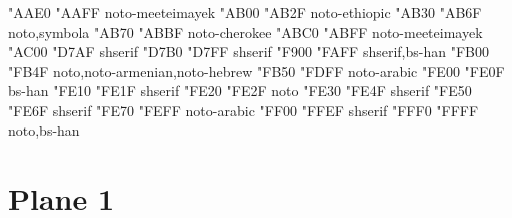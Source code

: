 \documentclass{article}
\begin{document}
                        {  "AAE0} {  "AAFF} {noto-meeteimayek}
                            {  "AB00} {  "AB2F} {noto-ethiopic}
                               {  "AB30} {  "AB6F} {noto,symbola}
                            {  "AB70} {  "ABBF} {noto-cherokee}
                                   {  "ABC0} {  "ABFF} {noto-meeteimayek}
                               {  "AC00} {  "D7AF} {shserif}
                         {  "D7B0} {  "D7FF} {shserif}
                   {  "F900} {  "FAFF} {shserif,bs-han}
                  {  "FB00} {  "FB4F} {noto,noto-armenian,noto-hebrew}
                    {  "FB50} {  "FDFF} {noto-arabic}
                            {  "FE00} {  "FE0F} {bs-han}
                                 {  "FE10} {  "FE1F} {shserif}
                           {  "FE20} {  "FE2F} {noto}
                        {  "FE30} {  "FE4F} {shserif}
                            {  "FE50} {  "FE6F} {shserif}
                    {  "FE70} {  "FEFF} {noto-arabic}
                  {  "FF00} {  "FFEF} {shserif}
                                       {  "FFF0} {  "FFFF} {noto,bs-han}

\section{Plane 1}
\end{document}
